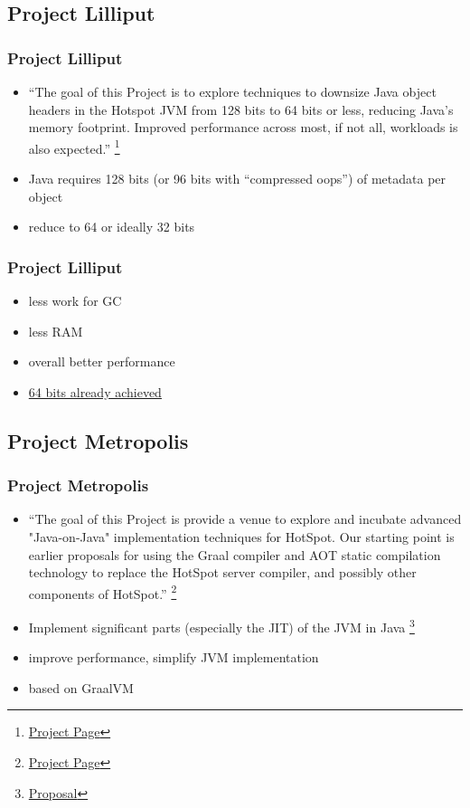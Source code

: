 \documentclass{beamer}
\begin{document}
\subsection{Project Lilliput}
\begin{frame}
\frametitle{Project Lilliput}
\begin{itemize}
  \item ``The goal of this Project is to explore techniques to downsize Java object headers in the Hotspot JVM from 128 bits to 64 bits or less, reducing Java's memory footprint. Improved performance across most, if not all, workloads is also expected.''
  \footnote{\href{https://openjdk.org/projects/lilliput/}{Project Page}}
  \pause
  \item Java requires 128 bits (or 96 bits with ``compressed oops'') of metadata per object
  \item reduce to 64 or ideally 32 bits
\end{itemize}
\end{frame}
\begin{frame}
\frametitle{Project Lilliput}
\begin{itemize}
  \item less work for GC
  \item less RAM
  \item overall better performance
  \pause
  \item \href{https://mail.openjdk.org/pipermail/lilliput-dev/2022-May/000457.html}{64 bits already achieved}
\end{itemize}
\end{frame}

\subsection{Project Metropolis}
\begin{frame}
\frametitle{Project Metropolis}
\begin{itemize}
  \item ``The goal of this Project is provide a venue to explore and incubate advanced "Java-on-Java" implementation techniques for HotSpot. Our starting point is earlier proposals for using the Graal compiler and AOT static compilation technology to replace the HotSpot server compiler, and possibly other components of HotSpot.''
  \footnote{\href{https://openjdk.org/projects/metropolis/}{Project Page}}
  \pause
  \item Implement significant parts (especially the JIT) of the JVM in Java
  \footnote{\href{https://cr.openjdk.java.net/~jrose/metropolis/Metropolis-Proposal.html}{Proposal}}
  \item improve performance, simplify JVM implementation
  \item based on GraalVM
\end{itemize}
\end{frame}
\end{document}
